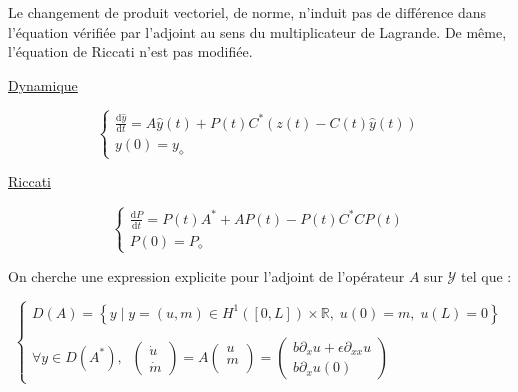 \documentclass[a4paper]{article}
\newcommand{\dep}{b}
\begin{document}
\begin{remarque}
	Le changement de produit vectoriel, de norme, 
	n'induit pas de différence dans l'équation vérifiée par l'adjoint
	au sens du multiplicateur de Lagrande.
	De même, l'équation de Riccati n'est pas modifiée.
\end{remarque}

\vspace{0.3cm}

\underline{Dynamique}

\begin{equation}
	\begin{cases}
    \displaystyle \frac{\mathrm{d} \hat{y}}{\mathrm{d}t} = A \hat{y}(t) + P(t) C^* (z(t) - C(t)\hat{y}(t)) \\
    y(0) = y_{\diamond}
     \end{cases}	
\end{equation}

\underline{Riccati}

\begin{equation}
	\begin{cases}
    \displaystyle \frac{\mathrm{d} P}{\mathrm{d}t} = P(t)A^* + AP(t) - P(t) C^* CP(t) \\
    P(0) = P_{\diamond}
     \end{cases}	
\end{equation}


\vspace{0.3cm}
On cherche une expression explicite pour
l'adjoint de l'opérateur $A$ sur $\mathscr{Y}$ tel que :

\begin{equation}
	\begin{cases}
		D(A) = \left\{ y \; | \; y = (u,m) \in H^1([0,L])\times \mathbb{R},
 \; u(0)=m, \; u(L)=0 \right\} \\
        \\
        \forall y \in D(A^*), \; \;
		\left( \begin{array}{c}
		\dot{u}\\
		\dot{m}
		\end{array} \right)
		= A \left( \begin{array}{c}
		u\\
		m\\
		\end{array} \right) 
		= \left(\begin{array}{c}
		\dep \partial_x u + \epsilon \partial_{xx} u\\
		\dep \partial_x u(0)
		\end{array}\right)
	\end{cases}
\end{equation}
\end{document}
